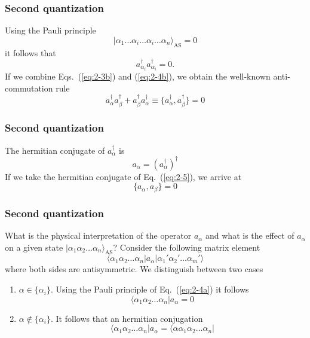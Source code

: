 \documentclass[compress]{beamer}
\newcommand*{\ket}[1]{|#1\rangle}
\newcommand*{\bra}[1]{\langle#1|}
\newcommand{\element}[3]
        {\bra{#1}#2\ket{#3}}
\begin{document}
\frame
{
  \frametitle{Second quantization}
\begin{small}
{\scriptsize
Using the Pauli principle
\begin{equation}
	\ket{\alpha_1\dots \alpha_i\dots \alpha_i\dots \alpha_n}_{\mathrm{AS}} = 0 \label{eq:2-4a}
\end{equation}
it follows that
\begin{equation}
	a_{\alpha_i}^\dagger  a_{\alpha_i}^\dagger = 0. \label{eq:2-4b}
\end{equation}
If we combine Eqs.~(\ref{eq:2-3b}) and (\ref{eq:2-4b}), we obtain the well-known anti-commutation rule
\begin{equation}
	a_{\alpha}^\dagger  a_{\beta}^\dagger + a_{\beta}^\dagger  a_{\alpha}^\dagger \equiv 
		\{a_{\alpha}^\dagger,a_{\beta}^\dagger\} = 0 \label{eq:2-5}
\end{equation}
}
\end{small}
}

\frame
{
  \frametitle{Second quantization}
\begin{small}
{\scriptsize
The hermitian conjugate  of $a_\alpha^\dagger$ is
\begin{equation}
	a_{\alpha} = ( a_{\alpha}^\dagger )^\dagger \label{eq:2-6}
\end{equation}
If we take the hermitian conjugate of Eq.~(\ref{eq:2-5}), we arrive at 
\begin{equation}
	\{a_{\alpha},a_{\beta}\} = 0 \label{eq:2-7}
\end{equation}
}
\end{small}
}

\frame
{
  \frametitle{Second quantization}
\begin{small}
{\scriptsize
What is the physical interpretation of the operator $a_\alpha$ and what is the effect of 
$a_\alpha$ on a given state $\ket{\alpha_1\alpha_2\dots\alpha_n}_{\mathrm{AS}}$? 
Consider the following matrix element
\begin{equation}
	\element{\alpha_1\alpha_2 \dots \alpha_n}{a_\alpha}{\alpha_1'\alpha_2' \dots \alpha_m'} \label{eq:2-8}
\end{equation}
where both sides are antisymmetric. We  distinguish between two cases
\begin{enumerate}
\item $\alpha \in \{\alpha_i\}$. Using the Pauli principle of Eq.~(\ref{eq:2-4a}) it follows
	\begin{equation}
		\bra{\alpha_1\alpha_2 \dots \alpha_n}a_\alpha = 0 \label{eq:2-9a}
	\end{equation}
\item  $\alpha \notin \{\alpha_i\}$. It follows that an hermitian conjugation
	\begin{equation}
		\bra{\alpha_1\alpha_2 \dots \alpha_n}a_\alpha = \bra{\alpha\alpha_1\alpha_2 \dots \alpha_n}  \label{eq:2-9b}
	\end{equation}
\end{enumerate}
}
\end{small}
}
\end{document}
